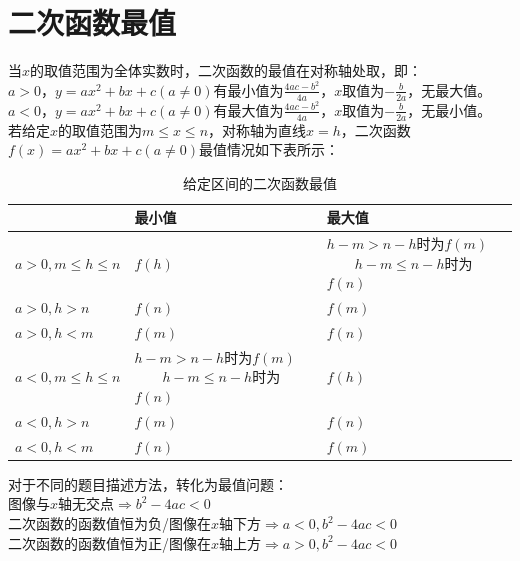 \documentclass{ecnuthesis}
\begin{document}
\section{二次函数最值}
\begin{knowledge}
    当$x$的取值范围为全体实数时，二次函数的最值在对称轴处取，即：\\
    $a>0$，$y=ax^2+bx+c(a\ne 0)$有最小值为$\frac{4ac-b^2}{4a}$，$x$取值为$-\frac{b}{2a}$，无最大值。\\
    $a<0$，$y=ax^2+bx+c(a\ne 0)$有最大值为$\frac{4ac-b^2}{4a}$，$x$取值为$-\frac{b}{2a}$，无最小值。 \\
    若给定$x$的取值范围为$m \le x \le n$，对称轴为直线$x=h$，二次函数$f(x)=ax^2+bx+c(a\ne 0)$最值情况如下表所示：
\end{knowledge}
\begin{table}[H]
\centering
\caption{给定区间的二次函数最值}
\begin{tabular}{l|p{5cm}|p{5cm}}
\hline
\hline
 & 最小值 & 最大值 \\
\hline
$a>0, m \le h \le n$ & $f(h)$ & $h-m>n-h$时为$f(m)$ $\qquad h-m\le n-h$时为$f(n)$ \\
$a>0, h > n$ & $f(n)$ & $f(m)$ \\
$a>0, h < m$ & $f(m)$ & $f(n)$ \\
$a<0, m \le h \le n$ & $h-m>n-h$时为$f(m)$ $\qquad h-m\le n-h$时为$f(n)$ & $f(h)$ \\
$a<0, h > n$ & $f(m)$ & $f(n)$ \\
$a<0, h < m$ & $f(n)$ & $f(m)$ \\
\hline
\hline
\end{tabular}
\end{table}
\begin{knowledge}
    对于不同的题目描述方法，转化为最值问题：\\
    图像与$x$轴无交点$\Rightarrow b^2-4ac<0$ \\
    二次函数的函数值恒为负/图像在$x$轴下方$\Rightarrow a<0, b^2-4ac < 0$ \\
    二次函数的函数值恒为正/图像在$x$轴上方$\Rightarrow a>0, b^2-4ac < 0$ \\
\end{knowledge}
\clearpage
\end{document}
